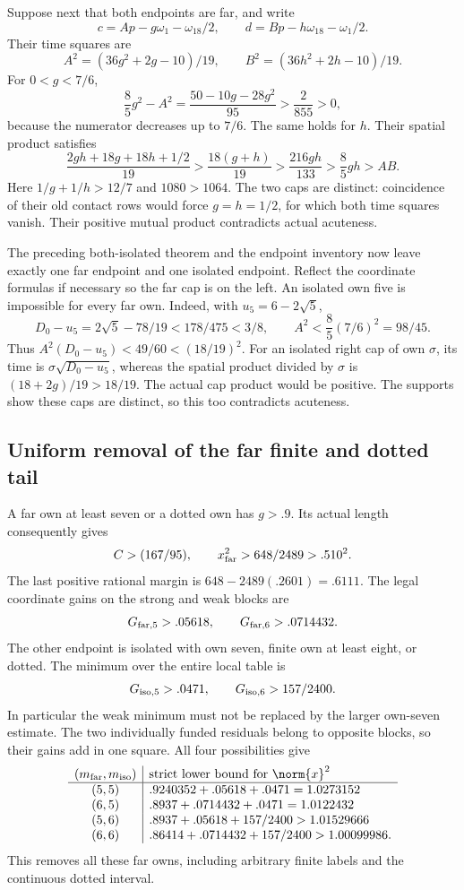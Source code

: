 Suppose next that both endpoints are far, and write
\[
 c=A p-g\omega_1-\omega_{18}/2,\qquad
 d=B p-h\omega_{18}-\omega_1/2.
\]
Their time squares are
\[
 A^2=(36g^2+2g-10)/19,\qquad
 B^2=(36h^2+2h-10)/19 .
\]
For \(0<g<7/6\),
\[
 \frac85g^2-A^2
   =\frac{50-10g-28g^2}{95}>\frac2{855}>0,
\]
because the numerator decreases up to \(7/6\).
The same holds for \(h\). Their spatial product satisfies
\[
 \frac{2gh+18g+18h+1/2}{19}
 >\frac{18(g+h)}{19}
 >\frac{216gh}{133}
 >\frac85gh>AB.
\]
Here \(1/g+1/h>12/7\) and \(1080>1064\).
The two caps are distinct: coincidence of their old contact rows
would force \(g=h=1/2\), for which both time squares vanish.
Their positive mutual product contradicts actual acuteness.

The preceding both-isolated theorem and the endpoint inventory
now leave exactly one far endpoint and one isolated endpoint.
Reflect the coordinate formulas if necessary so the far cap is
on the left. An isolated own five is impossible for every far own.
Indeed, with \(u_5=6-2\sqrt5\),
\[
 D_0-u_5=2\sqrt5-78/19<178/475<3/8,\qquad
 A^2<\frac85(7/6)^2=98/45.
\]
Thus \(A^2(D_0-u_5)<49/60<(18/19)^2\).
For an isolated right cap of own \(\sigma\), its time is
\(\sigma\sqrt{D_0-u_5}\), whereas the spatial product divided
by \(\sigma\) is \((18+2g)/19>18/19\).
The actual cap product would be positive. The supports show
these caps are distinct, so this too contradicts acuteness.

\subsection{Uniform removal of the far finite and dotted tail}
\label{app:A18fartail}
A far own at least seven or a dotted own has \(g>.9\).
Its actual length consequently gives
\[
 C>(167/95),\qquad
 x_{\rm far}^2>648/2489>.510^2.
\]
The last positive rational margin is
\(648-2489(.2601)=.6111\).
The legal coordinate gains on the strong and weak blocks are
\[
 G_{\rm far,5}>.05618,\qquad
 G_{\rm far,6}>.0714432.
\]
The other endpoint is isolated with own seven, finite own at least
eight, or dotted. The minimum over the entire local table is
\[
 G_{\rm iso,5}>.0471,\qquad G_{\rm iso,6}>157/2400 .
\]
In particular the weak minimum must not be replaced by the larger
own-seven estimate. The two individually funded residuals belong
to opposite blocks, so their gains add in one square. All four
possibilities give
\[
\begin{array}{c|l}
(m_{\rm far},m_{\rm iso})&
 \text{strict lower bound for }\norm{x}^2\\ \hline
(5,5)&.9240352+.05618+.0471=1.0273152\\
(6,5)&.8937+.0714432+.0471=1.0122432\\
(5,6)&.8937+.05618+157/2400>1.01529666\\
(6,6)&.86414+.0714432+157/2400>1.00099986 .
\end{array}
\]
This removes all these far owns, including arbitrary finite
labels and the continuous dotted interval.

